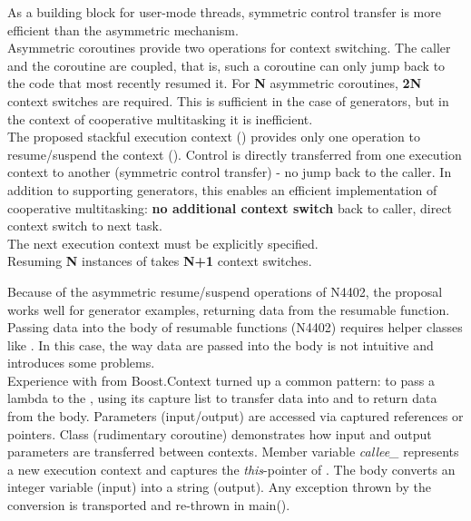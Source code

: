 As a building block for user-mode threads, symmetric control transfer is more
efficient than the asymmetric mechanism.\\
\newline
Asymmetric coroutines provide two operations for context switching. The caller
and the coroutine are coupled, that is, such a coroutine can only jump back to
the code that most recently resumed it.
For {\bfseries N} asymmetric coroutines, {\bfseries 2N} context switches are
required. This is sufficient in the case of generators, but in the context of
cooperative multitasking it is inefficient.\\
\newline
The proposed stackful execution context (\ectx) provides only one operation to
resume/suspend the context (\ectxop). Control is directly transferred from one
execution context to another (symmetric control transfer) - no jump back to
the caller. In addition to supporting generators, this enables an efficient
implementation of cooperative multitasking: {\bfseries no additional context
switch} back to caller, direct context switch to next task.\\
The next execution context must be explicitly specified.\\
\newline
{}
Resuming {\bfseries N} instances of \ectx takes {\bfseries N+1} context
switches.

Because of the asymmetric resume/suspend operations of N4402, the proposal
works well for generator examples, returning data from the resumable
function.\\
\newline
Passing data into the body of resumable functions (N4402) requires helper
classes like \channel.
In this case, the way data are passed into the body is not intuitive and
introduces some problems.\\
\newline
Experience with  from Boost.Context\cite{bcontext}
turned up a common pattern: to pass a lambda to the ,
using its capture list to transfer data into and to return data from the
body. Parameters (input/output) are accessed via captured references or
pointers.
Class  (rudimentary coroutine) demonstrates how input and output
parameters are transferred between contexts. Member variable
\emph{callee\_} represents a new execution context and captures the
\emph{this}-pointer of . The body converts an integer variable (input)
into a string (output). Any exception thrown by the conversion is transported
and re-thrown in main().

